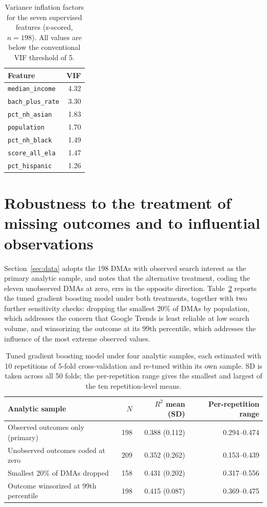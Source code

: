 \documentclass[11pt]{article}
\begin{document}
\begin{table}[!htbp]
\centering
\small
\begin{tabular}{lr}
\toprule
Feature & VIF \\
\midrule
\texttt{median\_income}    & 4.32 \\
\texttt{bach\_plus\_rate}  & 3.30 \\
\texttt{pct\_nh\_asian}    & 1.83 \\
\texttt{population}        & 1.70 \\
\texttt{pct\_nh\_black}    & 1.49 \\
\texttt{score\_all\_ela}   & 1.47 \\
\texttt{pct\_hispanic}     & 1.26 \\
\bottomrule
\end{tabular}
\caption{Variance inflation factors for the seven supervised features (z-scored, $n=198$). All values are below the conventional VIF threshold of 5.}
\label{tab:vif}
\end{table}

\section{Robustness to the treatment of missing outcomes and to influential observations}
\label{sec:approbust}

Section~\ref{sec:data} adopts the 198 DMAs with observed search interest as the primary analytic sample, and notes that the alternative treatment, coding the eleven unobserved DMAs at zero, errs in the opposite direction. Table~\ref{tab:robust} reports the tuned gradient boosting model under both treatments, together with two further sensitivity checks: dropping the smallest 20\% of DMAs by population, which addresses the concern that Google Trends is least reliable at low search volume, and winsorizing the outcome at its 99th percentile, which addresses the influence of the most extreme observed values.

\begin{table}[!htbp]
\centering
\small
\begin{tabular}{lrrr}
\toprule
Analytic sample & $N$ & $R^2$ mean (SD) & Per-repetition range \\
\midrule
Observed outcomes only (primary)      & 198 & 0.388 (0.112) & 0.294--0.474 \\
Unobserved outcomes coded at zero     & 209 & 0.352 (0.262) & 0.153--0.439 \\
Smallest 20\% of DMAs dropped         & 158 & 0.431 (0.202) & 0.317--0.556 \\
Outcome winsorized at 99th percentile & 198 & 0.415 (0.087) & 0.369--0.475 \\
\bottomrule
\end{tabular}
\caption{Tuned gradient boosting model under four analytic samples, each estimated with 10 repetitions of 5-fold cross-validation and re-tuned within its own sample. SD is taken across all 50 folds; the per-repetition range gives the smallest and largest of the ten repetition-level means.}
\label{tab:robust}
\end{table}
\end{document}

